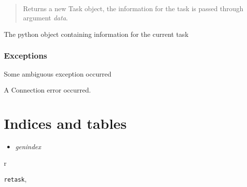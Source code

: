 \documentclass[letterpaper,10pt,english]{sphinxmanual}
\begin{document}
\begin{fulllineitems}
\label{retask.task:retask.Task}~\begin{quote}

Returns a new Task object, the information for the task is passed through argument \emph{data}.
\end{quote}

\begin{fulllineitems}
\label{retask.task:retask.Task.data}
The python object containing information for the current task

\end{fulllineitems}


\end{fulllineitems}



\subsection{Exceptions}
\label{api:exceptions}

\begin{fulllineitems}
\label{api:retask.RetaskException}
Some ambiguous exception occurred

\end{fulllineitems}


\begin{fulllineitems}
\label{api:retask.ConnectionError}
A Connection error occurred.

\end{fulllineitems}



\chapter{Indices and tables}
\label{index:indices-and-tables}\begin{itemize}
\item {} 
\emph{genindex}

\end{itemize}


\renewcommand{\indexname}{Python Module Index}
\begin{theindex}
\def\bigletter#1{{\Large\sffamily#1}\nopagebreak\vspace{1mm}}
\bigletter{r}
\item {\texttt{retask}}, \pageref{api:module-retask}
\end{theindex}

\renewcommand{\indexname}{Index}
\printindex
\end{document}
